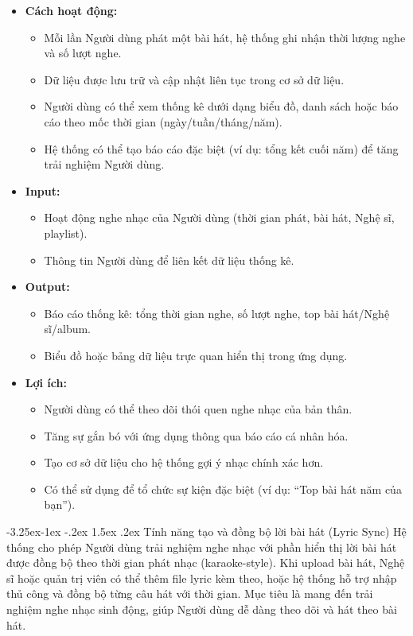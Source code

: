 \documentclass[a4paper]{article}
\makeatletter
\newcommand{\cach}{\hspace*{1.5em}\ignorespaces}
\newcounter {subsubsubsection}[subsubsection]
\newcommand\subsubsubsection{\@startsection{subsubsubsection}{4}{\z@}%
                                     {-3.25ex\@plus -1ex \@minus -.2ex}%
                                     {1.5ex \@plus .2ex}%
                                     {\normalfont\normalsize\bfseries}}
\makeatother
\begin{document}
\begin{itemize}
	\item \textbf{Cách hoạt động:}
	      \begin{itemize}
		      \item Mỗi lần Người dùng phát một bài hát, hệ thống ghi nhận thời lượng nghe và số lượt nghe.
		      \item Dữ liệu được lưu trữ và cập nhật liên tục trong cơ sở dữ liệu.
		      \item Người dùng có thể xem thống kê dưới dạng biểu đồ, danh sách hoặc báo cáo theo mốc thời gian (ngày/tuần/tháng/năm).
		      \item Hệ thống có thể tạo báo cáo đặc biệt (ví dụ: tổng kết cuối năm) để tăng trải nghiệm Người dùng.
	      \end{itemize}

	\item \textbf{Input:}
	      \begin{itemize}
		      \item Hoạt động nghe nhạc của Người dùng (thời gian phát, bài hát, Nghệ sĩ, playlist).
		      \item Thông tin Người dùng để liên kết dữ liệu thống kê.
	      \end{itemize}

	\item \textbf{Output:}
	      \begin{itemize}
		      \item Báo cáo thống kê: tổng thời gian nghe, số lượt nghe, top bài hát/Nghệ sĩ/album.
		      \item Biểu đồ hoặc bảng dữ liệu trực quan hiển thị trong ứng dụng.
	      \end{itemize}


	\item \textbf{Lợi ích:}
	      \begin{itemize}
		      \item Người dùng có thể theo dõi thói quen nghe nhạc của bản thân.
		      \item Tăng sự gắn bó với ứng dụng thông qua báo cáo cá nhân hóa.
		      \item Tạo cơ sở dữ liệu cho hệ thống gợi ý nhạc chính xác hơn.
		      \item Có thể sử dụng để tổ chức sự kiện đặc biệt (ví dụ: “Top bài hát năm của bạn”).
	      \end{itemize}
\end{itemize}
\subsubsubsection{Tính năng tạo và đồng bộ lời bài hát (Lyric Sync)}
\cach Hệ thống cho phép Người dùng trải nghiệm nghe nhạc với phần hiển thị lời bài hát được đồng bộ theo thời gian phát nhạc (karaoke-style).
Khi upload bài hát, Nghệ sĩ hoặc quản trị viên có thể thêm file lyric kèm theo, hoặc hệ thống hỗ trợ nhập thủ công và đồng bộ từng câu hát với thời gian.
Mục tiêu là mang đến trải nghiệm nghe nhạc sinh động, giúp Người dùng dễ dàng theo dõi và hát theo bài hát.
\end{document}
